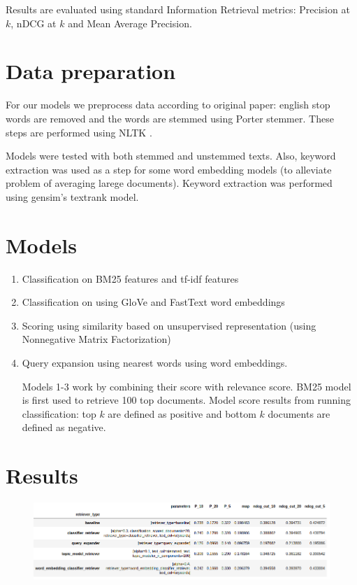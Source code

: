 \documentclass{article}
\begin{document}
Results are evaluated using standard Information Retrieval metrics: Precision at $k$, nDCG at $k$ and Mean Average Precision.

\section{Data preparation} 
For our models we preprocess data according to original paper: english stop words are removed and the words are stemmed using Porter stemmer. These steps are performed using NLTK \citep{Loper02nltk:the}.

Models were tested with both stemmed and unstemmed texts. Also, keyword extraction was used as a step for some word embedding models (to alleviate problem of averaging larege documents). Keyword extraction was performed using gensim's \citep{rehurek_lrec} textrank model.

\section{Models}
 
\begin{enumerate}
  \item Classification on BM25 features and tf-idf features \citep{DBLP:journals/corr/abs-1904-08861}
  \item Classification on using GloVe \citep{Pennington14glove:global} and FastText \citep{bojanowski2016enriching}  word embeddings 
  \item Scoring using similarity based on unsupervised representation (using Nonnegative Matrix Factorization)
  \item Query expansion using nearest words using word embeddings.
  
Models 1-3 work by combining their score with relevance score. BM25 model is first used to retrieve 100 top documents. Model score results from running classification: top $k$ are defined as positive and bottom $k$ documents are defined as negative.
  
\end{enumerate}

\section{Results}
\begin{figure}[h!]
\centering
\includegraphics[scale=0.5]{images/results.png}
\label{fig:universe}
\end{figure}
\end{document}
